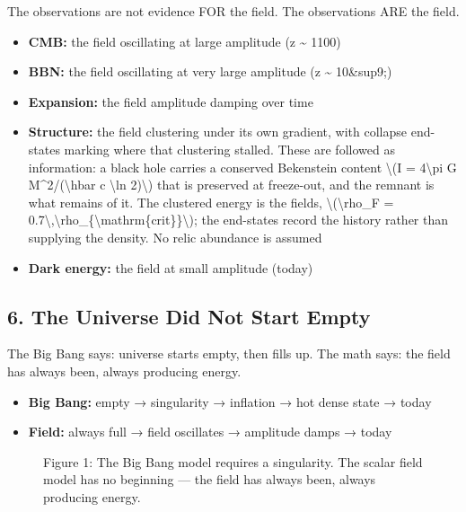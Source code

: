 \documentclass[
  10pt,
]{article}
\providecommand{\tightlist}{%
  \setlength{\itemsep}{0pt}\setlength{\parskip}{0pt}}
\begin{document}
The observations are not evidence FOR the field. The observations ARE
the field.

\begin{itemize}
\tightlist
\item
  \textbf{CMB:} the field oscillating at large amplitude (z
  \textasciitilde{} 1100)
\item
  \textbf{BBN:} the field oscillating at very large amplitude (z
  \textasciitilde{} 10\&sup9;)
\item
  \textbf{Expansion:} the field amplitude damping over time
\item
  \textbf{Structure:} the field clustering under its own gradient, with
  collapse end-states marking where that clustering stalled. These are
  followed as information: a black hole carries a conserved Bekenstein
  content \textbackslash(I = 4\textbackslash pi G
  M\^{}2/(\textbackslash hbar c \textbackslash ln 2)\textbackslash) that
  is preserved at freeze-out, and the remnant is what remains of it. The
  clustered energy is the field\textquotesingle s,
  \textbackslash(\textbackslash rho\_F =
  0.7\textbackslash,\textbackslash rho\_\{\textbackslash mathrm\{crit\}\}\textbackslash);
  the end-states record the history rather than supplying the density.
  No relic abundance is assumed
\item
  \textbf{Dark energy:} the field at small amplitude (today)
\end{itemize}

\hypertarget{the-universe-did-not-start-empty}{%
\subsection{6. The Universe Did Not Start
Empty}\label{the-universe-did-not-start-empty}}

The Big Bang says: universe starts empty, then fills up. The math says:
the field has always been, always producing energy.

\begin{itemize}
\tightlist
\item
  \textbf{Big Bang:} empty → singularity → inflation → hot dense state →
  today
\item
  \textbf{Field:} always full → field oscillates → amplitude damps →
  today
\end{itemize}

\begin{figure}
\centering

\caption{Figure 1: The Big Bang model requires a singularity. The scalar
field model has no beginning --- the field has always been, always
producing energy.}
\end{figure}
\end{document}
